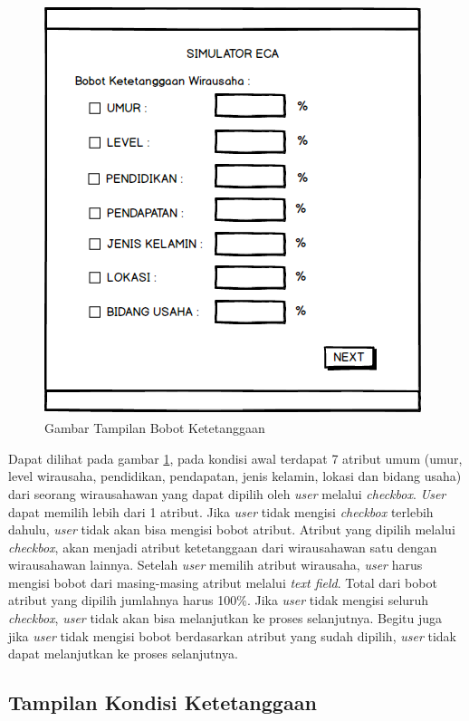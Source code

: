 \begin{figure} [H]
	\centering  
	\includegraphics[width=11cm, height=12cm]{mockup1} 
	\caption[Gambar Tampilan Bobot Ketetanggaan]{Gambar Tampilan Bobot Ketetanggaan}
	\label{fig:kondisiInternal} 
\end{figure}

Dapat dilihat pada gambar \ref{fig:kondisiInternal}, pada kondisi awal terdapat 7 atribut umum (umur, level wirausaha, pendidikan, pendapatan, jenis kelamin, lokasi dan bidang usaha) dari seorang wirausahawan yang dapat dipilih oleh \textit{user} melalui \textit{checkbox}. \textit{User} dapat memilih lebih dari 1 atribut. Jika \textit{user} tidak mengisi \textit{checkbox} terlebih dahulu, \textit{user} tidak akan bisa mengisi bobot atribut. Atribut yang dipilih melalui \textit{checkbox}, akan menjadi atribut ketetanggaan dari wirausahawan satu dengan wirausahawan lainnya. Setelah \textit{user} memilih atribut wirausaha, \textit{user} harus mengisi bobot dari masing-masing atribut melalui \textit{text field}. Total dari bobot atribut yang dipilih jumlahnya harus 100\%. Jika \textit{user} tidak mengisi seluruh \textit{checkbox}, \textit{user} tidak akan bisa melanjutkan ke proses selanjutnya. Begitu juga jika \textit{user} tidak mengisi bobot berdasarkan atribut yang sudah dipilih, \textit{user} tidak dapat melanjutkan ke proses selanjutnya.

\subsection{Tampilan Kondisi Ketetanggaan}

